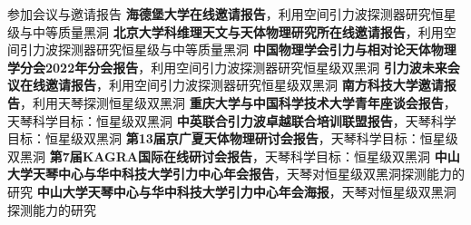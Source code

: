 
\begin{rubric}{参加会议与邀请报告}
    \entry*[2023] \textbf{海德堡大学在线邀请报告}，利用空间引力波探测器研究恒星级与中等质量黑洞
    \entry*[2023] \textbf{北京大学科维理天文与天体物理研究所在线邀请报告}，利用空间引力波探测器研究恒星级与中等质量黑洞
    \entry*[2022] \textbf{中国物理学会引力与相对论天体物理学分会2022年分会报告}，利用空间引力波探测器研究恒星级双黑洞
    \entry*[2022] \textbf{引力波未来会议在线邀请报告}，利用空间引力波探测器研究恒星级双黑洞
    \entry*[2022] \textbf{南方科技大学邀请报告}，利用天琴探测恒星级双黑洞 
    \entry*[2021] \textbf{重庆大学与中国科学技术大学青年座谈会报告}，天琴科学目标：恒星级双黑洞
    \entry*[2021] \textbf{中英联合引力波卓越联合培训联盟报告}，天琴科学目标：恒星级双黑洞
    \entry*[2020] \textbf{第13届京广夏天体物理研讨会报告}，天琴科学目标：恒星级双黑洞
    \entry*[2020] \textbf{第7届KAGRA国际在线研讨会报告}，天琴科学目标：恒星级双黑洞
    \entry*[2019] \textbf{中山大学天琴中心与华中科技大学引力中心年会报告}，天琴对恒星级双黑洞探测能力的研究 
    \entry*[2018] \textbf{中山大学天琴中心与华中科技大学引力中心年会海报}，天琴对恒星级双黑洞探测能力的研究
\end{rubric}
